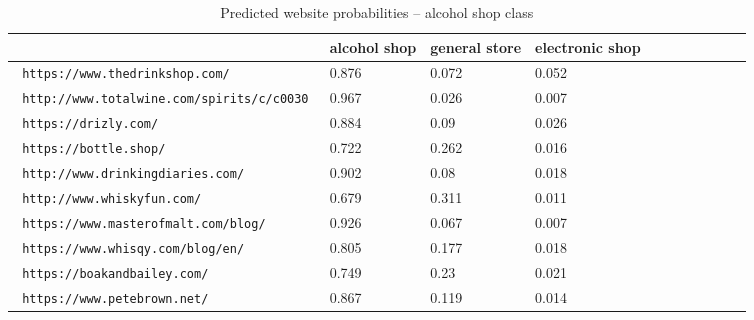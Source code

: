 \begin{table}[!hbt]
    \caption{ Predicted website probabilities -- alcohol shop class
    \label{table:res1}
    }
\footnotesize
\begin{center}
    \begin{tabular}{|l|l|l|l|l|l|l|l|l|l|l|}
    \hline
        & alcohol shop & general store & electronic shop \\
    \hline
\verb| https://www.thedrinkshop.com/ | &
0.876&0.072&0.052
\\
\verb| http://www.totalwine.com/spirits/c/c0030 | &
0.967&0.026&0.007
\\
\verb| https://drizly.com/ | &
0.884&0.09&0.026
\\
\verb| https://bottle.shop/ | &
0.722&0.262&0.016
\\
\verb| http://www.drinkingdiaries.com/ | &
0.902&0.08&0.018
\\
\verb| http://www.whiskyfun.com/ | &
0.679&0.311&0.011
\\
\verb| https://www.masterofmalt.com/blog/ | &
0.926&0.067&0.007
\\
\verb| https://www.whisqy.com/blog/en/ | &
0.805&0.177&0.018
\\
\verb| https://boakandbailey.com/ | &
0.749&0.23&0.021
\\
\verb| https://www.petebrown.net/ | &
0.867&0.119&0.014
\\
    \hline
    \end{tabular}
\end{center}
\end{table}

